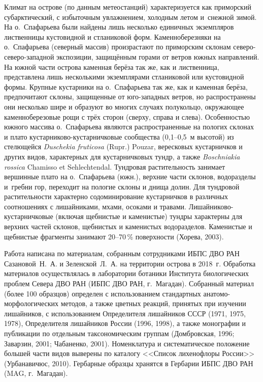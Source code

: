 Климат на острове (по данным метеостанций) характеризуется как приморский субарктический, с избыточным увлажнением, холодным летом и~снежной зимой. На о.~Спафарьева были найдены лишь несколько единичных экземпляров лиственницы кустовидной и стланиковой форм. Каменноберезняки на о.~Спафарьева (северный массив) произрастают по приморским склонам северо-северо-западной экспозиции, защищённым горами от ветров южных направлений. На южной части острова каменная берёза так же, как и лиственница, представлена лишь несколькими экземплярами стланиковой или кустовидной формы. Крупные кустарники на о.~Спафарьева так же, как и каменная берёза, предпочитают склоны, защищенные от юго-западных ветров, но распространены они несколько шире и образуют во многих случаях полукольцо, окружающее каменноберезовые рощи с трёх сторон (сверху, справа и слева). Особенностью южного массива о.~Спафарьева являются распространенные на пологих склонах и плато кустарниково-кустарничковые сообщества (0,1--0,5~м высотой) из стелющейся \textit{Duschekia fruticosa} (Rupr.) Pouzar, вересковых кустарничков и других видов, характерных для кустарничковых тундр, а также \textit{Boschniakia rossica} Chamisso et Sehlechtendal. Тундровая растительность занимает вершинные плато на о.~Спафарьева (южн.), верхние части склонов, водоразделы и~гребни гор, переходит на пологие склоны и днища долин. Для тундровой растительности характерно содоминирование кустарничков в различных соотношениях с лишайниками, мхами, осоками и травами. Лишайниково-кустарничковые (включая щебнистые и каменистые) тундры характерны для верхних частей склонов, щебнистых и каменистых водоразделов. Каменистые и щебнистые фрагменты занимают 20--70\,\% поверхности (Хорева, 2003).




Работа написана по материалам, собранным сотрудниками ИБПС ДВО РАН Сазановой~Н.~А. и Зеленской~Л.~А. на территории острова в 2018~г. Обработка материалов осуществлялась в лаборатории ботаники Института биологических проблем Севера ДВО РАН (ИБПС ДВО РАН, г.~Магадан). Собранный материал (более 100 образцов) определен с использованием стандартных анатомо-морфологических методов, а также цветных реакций, принятых при изучении лишайников, с использованием Определителя лишайников СССР (1971, 1975, 1978), Определителя лишайников России (1996, 1998), а также  монографии и публикации по отдельным таксономическим группам (Домбровская, 1996; Заварзин, 2001; Чабаненко, 2001). Номенклатура и систематическое положение большей части видов выверены по каталогу <<Список лихенофлоры России>> (Урбанавичюс, 2010). Гербарные образцы хранятся в Гербарии ИБПС ДВО РАН (MAG, г.~Магадан).

